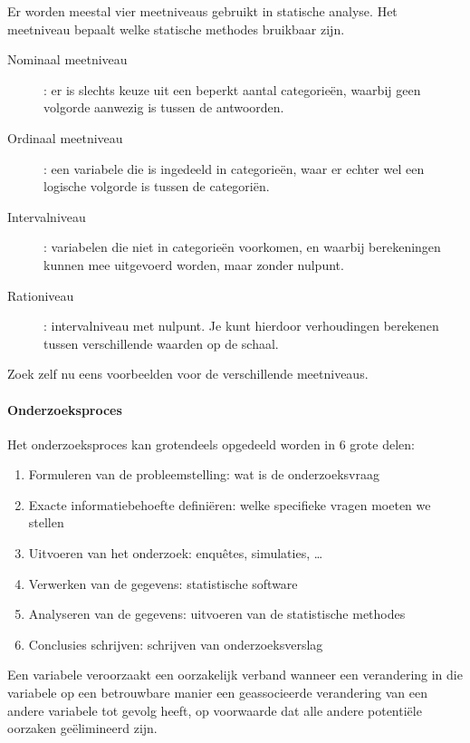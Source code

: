 Er worden meestal vier meetniveaus gebruikt in statische analyse. Het meetniveau bepaalt welke statische methodes bruikbaar zijn. 
\begin{description}
	\item [Nominaal meetniveau] : er is slechts keuze uit een beperkt aantal categorie\"en, waarbij geen volgorde aanwezig is tussen de antwoorden.
	\item [Ordinaal meetniveau] : een variabele die is ingedeeld in categorie\"en, waar er echter wel een logische volgorde is tussen de categori\"en. 
	\item [Intervalniveau] : variabelen die niet in categorie\"en voorkomen, en waarbij berekeningen kunnen mee uitgevoerd worden, maar zonder nulpunt.
	\item [Rationiveau] : intervalniveau met nulpunt. Je kunt hierdoor verhoudingen berekenen tussen verschillende waarden op de schaal.
\end{description}

\begin{exercise}
	Zoek zelf nu eens voorbeelden voor de verschillende meetniveaus.
\end{exercise}

\paragraph{Onderzoeksproces}
Het onderzoeksproces kan grotendeels opgedeeld worden in 6 grote delen:
\begin{enumerate}
	\item Formuleren van de probleemstelling: wat is de onderzoeksvraag
	\item Exacte informatiebehoefte defini\"eren: welke specifieke vragen moeten we stellen
	\item Uitvoeren van het onderzoek: enqu\^etes, simulaties, \dots
	\item Verwerken van de gegevens: statistische software
	\item Analyseren van de gegevens: uitvoeren van de statistische methodes
	\item Conclusies schrijven: schrijven van onderzoeksverslag
\end{enumerate}

\begin{definition}
 Een variabele veroorzaakt een oorzakelijk verband wanneer een verandering in die variabele op een betrouwbare manier een geassocieerde verandering van een andere variabele tot gevolg heeft, op voorwaarde dat alle andere potenti\"ele oorzaken ge\"elimineerd zijn.
\end{definition}

